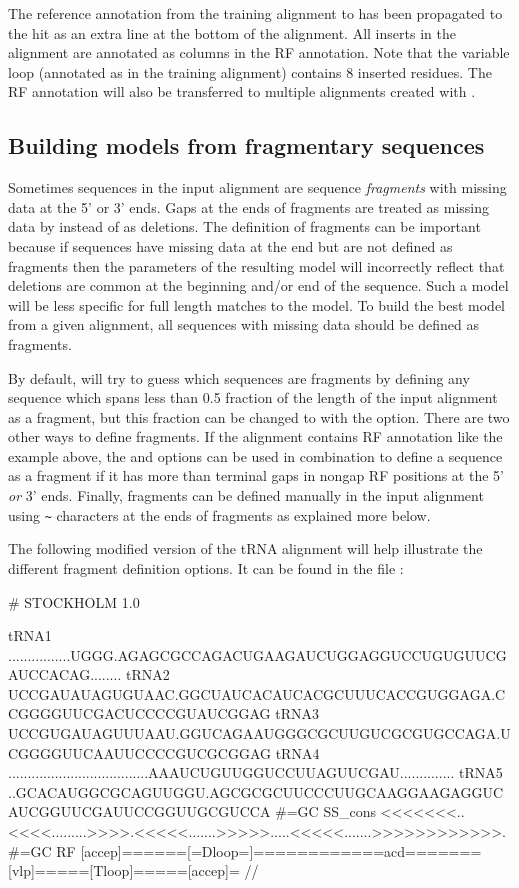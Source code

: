 The reference annotation from the training alignment to 
has been propagated to the hit as an extra  line at the
bottom of the alignment. All inserts in the alignment are annotated as
 columns in the RF annotation. Note that the variable loop
(annotated as \otext{[vlp]} in the training alignment) contains 8
inserted residues. The RF annotation will also be transferred to
multiple alignments created with .

\subsection{Building models from fragmentary sequences}

Sometimes sequences in the  input alignment are sequence
\emph{fragments} with missing data at the 5' or 3' ends. Gaps at the
ends of fragments are treated as missing data by 
instead of as deletions. The definition of fragments can be important
because if sequences have missing data at the end but are not
defined as fragments then the parameters of the resulting model will
incorrectly reflect that deletions are common at the beginning and/or end of the
sequence. Such a model will be less specific for full length matches
to the model. To build the best model from a given alignment, all sequences
with missing data should be defined as fragments.

By default,  will try to guess which sequences are
fragments by defining any sequence which spans less than 0.5 fraction of the
length of the input alignment as a fragment, but this
fraction can be changed to  with the 
option. There are two other ways to define fragments. If the
alignment contains RF annotation like the example above, the 
 and  options can be used in
combination to define a sequence as a fragment if it has more than
 terminal gaps in nongap RF positions at the 5' \emph{or} 3'
ends. Finally, fragments can be defined manually in the input alignment
using \verb+~+ characters at the ends of fragments as explained more below.

The following modified version of the tRNA alignment will help
illustrate the different fragment definition options. It can be found in
the file :

\begin{sreoutput}
# STOCKHOLM 1.0

tRNA1             ................UGGG.AGAGCGCCAGACUGAAGAUCUGGAGGUCCUGUGUUCGAUCCACAG........
tRNA2             UCCGAUAUAGUGUAAC.GGCUAUCACAUCACGCUUUCACCGUGGAGA.CCGGGGUUCGACUCCCCGUAUCGGAG
tRNA3             UCCGUGAUAGUUUAAU.GGUCAGAAUGGGCGCUUGUCGCGUGCCAGA.UCGGGGUUCAAUUCCCCGUCGCGGAG
tRNA4             ....................................AAAUCUGUUGGUCCUUAGUUCGAU..............
tRNA5             ..GCACAUGGCGCAGUUGGU.AGCGCGCUUCCCUUGCAAGGAAGAGGUCAUCGGUUCGAUUCCGGUUGCGUCCA
#=GC SS_cons      <<<<<<<..<<<<.........>>>>.<<<<<.......>>>>>.....<<<<<.......>>>>>>>>>>>>.
#=GC RF           [accep]======[=Dloop=]============acd=======[vlp]=====[Tloop]=====[accep]=
//
\end{sreoutput}

